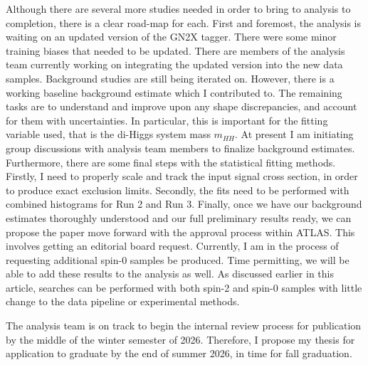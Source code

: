 \documentclass[12pt]{article}
\begin{document}
Although there are several more studies needed in order to bring to analysis to
completion, there is a clear road-map for each. First and foremost, the analysis
is waiting on an updated version of the GN2X tagger. There were some minor
training biases that needed to be updated. There are members of the analysis
team currently working on integrating the updated version into the new data
samples. Background studies are still being iterated on. However, there is a
working baseline background estimate which I contributed to. The remaining tasks
are to understand and improve upon any shape discrepancies, and account for them
with uncertainties. In particular, this is important for the fitting variable
used, that is the di-Higgs system mass $m_{HH}$. At present I am initiating
group discussions with analysis team members to finalize background estimates.
Furthermore, there are some final steps with the statistical fitting methods.
Firstly, I need to properly scale and track the input signal cross section, in
order to produce exact exclusion limits. Secondly, the fits need to be performed
with combined histograms for Run 2 and Run 3. Finally, once we have our
background estimates thoroughly understood and our full preliminary results
ready, we can propose the paper move forward with the approval process within
ATLAS. This involves getting an editorial board request. Currently, I am in the
process of requesting additional spin-0 samples be produced. Time permitting, we
will be able to add these results to the analysis as well. As discussed earlier
in this article, searches can be performed with both spin-2 and spin-0 samples
with little change to the data pipeline or experimental methods.

The analysis team is on track to begin the internal review process for
publication by the middle of the winter semester of 2026. Therefore, I propose
my thesis for application to graduate by the end of summer 2026, in time for
fall graduation.

\end{document}
